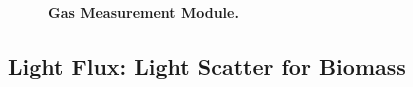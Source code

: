 \documentclass[12pt,a4paper]{scrartcl}
\begin{document}
\begin{figure}[ht]
  \begin{minipage}{.49\textwidth}
  \end{minipage}
  \begin{minipage}{.49\textwidth}
  \end{minipage}
\caption[]{\textbf{Gas Measurement Module.}}
\end{figure}

\clearpage
\subsection{Light Flux: Light Scatter for Biomass} 
\label{scatter}
\end{document}
